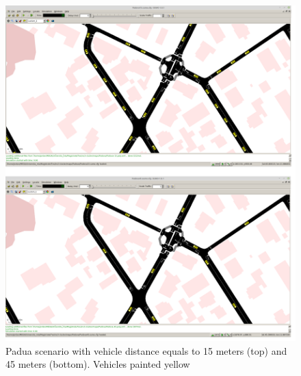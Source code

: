 	\begin{figure}[H]
		\centering
		\includegraphics[width=\textwidth]{immagini/sumo-distances}
		\caption{Padua scenario with vehicle distance equals to 15 meters (top) and 45 meters (bottom). Vehicles painted yellow}
		\label{fig:sumo-distances}
	\end{figure}
%	

